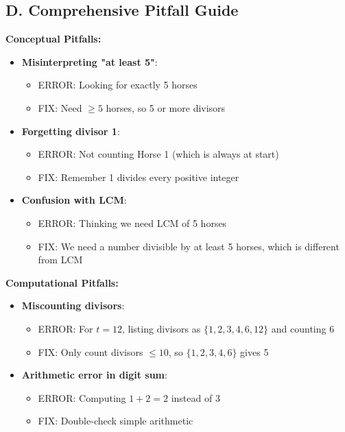 \documentclass[]{article}
\begin{document}
\begin{roadmapbox}
\subsection*{D. Comprehensive Pitfall Guide}

\textbf{Conceptual Pitfalls:}
\begin{itemize}[leftmargin=*]
    \item \textbf{Misinterpreting "at least 5"}:
    \begin{itemize}
        \item ERROR: Looking for exactly 5 horses
        \item FIX: Need $\geq 5$ horses, so 5 or more divisors
    \end{itemize}
    \item \textbf{Forgetting divisor 1}:
    \begin{itemize}
        \item ERROR: Not counting Horse 1 (which is always at start)
        \item FIX: Remember 1 divides every positive integer
    \end{itemize}
    \item \textbf{Confusion with LCM}:
    \begin{itemize}
        \item ERROR: Thinking we need LCM of 5 horses
        \item FIX: We need a number divisible by at least 5 horses, which is different from LCM
    \end{itemize}
\end{itemize}

\textbf{Computational Pitfalls:}
\begin{itemize}[leftmargin=*]
    \item \textbf{Miscounting divisors}:
    \begin{itemize}
        \item ERROR: For $t=12$, listing divisors as $\{1,2,3,4,6,12\}$ and counting 6
        \item FIX: Only count divisors $\leq 10$, so $\{1,2,3,4,6\}$ gives 5
    \end{itemize}
    \item \textbf{Arithmetic error in digit sum}:
    \begin{itemize}
        \item ERROR: Computing $1 + 2 = 2$ instead of 3
        \item FIX: Double-check simple arithmetic
    \end{itemize}
\end{itemize}


\end{roadmapbox}
\end{document}
